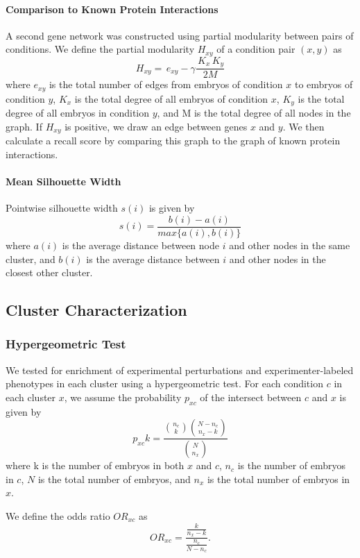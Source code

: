 \documentclass{article}
\begin{document}
\paragraph{Comparison to Known Protein Interactions}
A second gene network was constructed using partial modularity between pairs of conditions. We define the partial modularity $H_{xy}$ of a condition pair $(x,y)$ as 
\begin{equation}
 \,H_{xy} = \,e_{xy} - \gamma\frac{\,K_x\,K_y}{2M} \, 
\end{equation}
where $e_{xy}$ is the total number of edges from embryos of condition $x$ to embryos of condition $y$, $K_x$ is the total degree of all embryos of condition $x$, $K_y$ is the total degree of all embryos in condition $y$, and M is the total degree of all nodes in the graph. If $H_{xy}$ is positive, we draw an edge between genes $x$ and $y$. We then calculate a recall score by comparing this graph to the graph of known protein interactions.

\paragraph{Mean Silhouette Width}
Pointwise silhouette width\cite{ROUSSEEUW} $s(i)$ is given by 
\begin{equation}
s(i) = \frac{b(i) - a(i)}{max\{a(i),b(i)\}}
\end{equation}
where $a(i)$ is the average distance between node $i$ and other nodes in the same cluster, and $b(i)$ is the average distance between $i$ and other nodes in the closest other cluster.

\subsection{Cluster Characterization}
\subsubsection{Hypergeometric Test}
We tested for enrichment of experimental perturbations and experimenter-labeled phenotypes in each cluster using a hypergeometric test. For each condition $c$ in each cluster $x$, we assume the probability $p_{xc}$ of the intersect between $c$ and $x$ is given by
\begin{equation}
p_{xc}k = \frac{\binom{n_c}{k}\binom{N-n_c}{n_x-k}}{\binom{N}{n_x}}
\end{equation}
where k is the number of embryos in both $x$ and $c$, $n_c$ is the number of embryos in $c$, $N$ is the total number of embryos, and $n_x$ is the total number of embryos in $x$.

We define the odds ratio $OR_{xc}$ as
\begin{equation}
OR_{xc} = \frac{\frac{k}{n_x-k}}{\frac{n_c}{N-n_c}}.
\end{equation}

\end{document}
